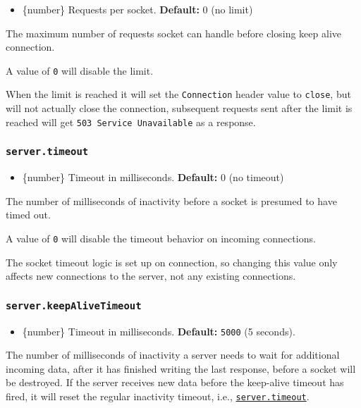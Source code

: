\begin{itemize}
\tightlist
\item
  \{number\} Requests per socket. \textbf{Default:} 0 (no limit)
\end{itemize}

The maximum number of requests socket can handle before closing keep
alive connection.

A value of \texttt{0} will disable the limit.

When the limit is reached it will set the \texttt{Connection} header
value to \texttt{close}, but will not actually close the connection,
subsequent requests sent after the limit is reached will get
\texttt{503\ Service\ Unavailable} as a response.

\subsubsection{\texorpdfstring{\texttt{server.timeout}}{server.timeout}}\label{server.timeout}

\begin{itemize}
\tightlist
\item
  \{number\} Timeout in milliseconds. \textbf{Default:} 0 (no timeout)
\end{itemize}

The number of milliseconds of inactivity before a socket is presumed to
have timed out.

A value of \texttt{0} will disable the timeout behavior on incoming
connections.

The socket timeout logic is set up on connection, so changing this value
only affects new connections to the server, not any existing
connections.

\subsubsection{\texorpdfstring{\texttt{server.keepAliveTimeout}}{server.keepAliveTimeout}}\label{server.keepalivetimeout}

\begin{itemize}
\tightlist
\item
  \{number\} Timeout in milliseconds. \textbf{Default:} \texttt{5000} (5
  seconds).
\end{itemize}

The number of milliseconds of inactivity a server needs to wait for
additional incoming data, after it has finished writing the last
response, before a socket will be destroyed. If the server receives new
data before the keep-alive timeout has fired, it will reset the regular
inactivity timeout, i.e.,
\hyperref[servertimeout]{\texttt{server.timeout}}.

